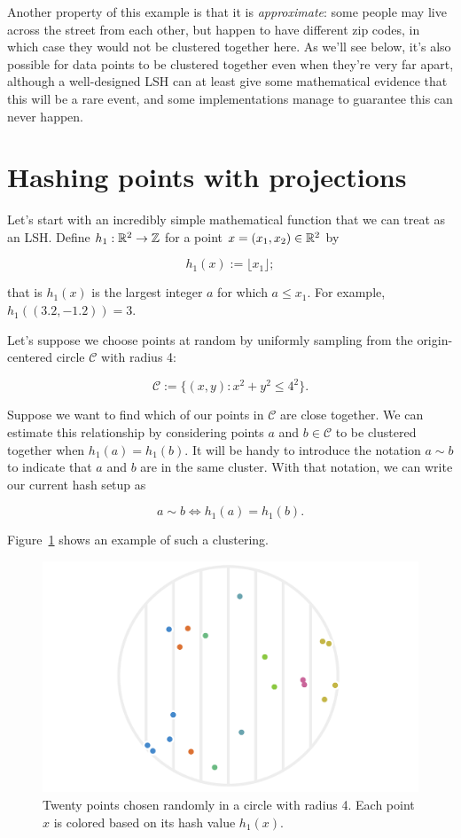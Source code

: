 \documentclass[20pt,]{extarticle}
\begin{document}
Another property of this example is that it is \emph{approximate}: some
people may live across the street from each other, but happen to have
different zip codes, in which case they would not be clustered together
here. As we'll see below, it's also possible for data points to be
clustered together even when they're very far apart, although a
well-designed LSH can at least give some mathematical evidence that this
will be a rare event, and some implementations manage to guarantee this
can never happen.

\section{Hashing points with
projections}\label{hashing-points-with-projections}

Let's start with an incredibly simple mathematical function that we can
treat as an LSH. Define \(h_1:\mathbb{R}^2 \to \mathbb{Z}\) for a point
\(x=(x_1, x_2)\in\mathbb{R}^2\) by

\[ h_1(x) := \lfloor x_1 \rfloor; \]

that is \(h_1(x)\) is the largest integer \(a\) for which \(a\le x_1.\)
For example, \(h_1((3.2, -1.2)) = 3.\)

Let's suppose we choose points at random by uniformly sampling from the
origin-centered circle \(\mathcal C\) with radius 4:

\[ \mathcal C := \{ (x, y) : x^2 + y^2 \le 4^2 \}. \]

Suppose we want to find which of our points in \(\mathcal C\) are close
together. We can estimate this relationship by considering points \(a\)
and \(b \in \mathcal C\) to be clustered together when
\(h_1(a) = h_1(b).\) It will be handy to introduce the notation
\(a \sim b\) to indicate that \(a\) and \(b\) are in the same cluster.
With that notation, we can write our current hash setup as

\[ a \sim b \iff h_1(a) = h_1(b). \]

Figure~\ref{fig:fig1} shows an example of such a clustering.

\begin{figure}
\centering
\includegraphics{images/lsh_image1_v2.png}
\caption{Twenty points chosen randomly in a circle with radius 4. Each
point \(x\) is colored based on its hash value
\(h_1(x).\)}\label{fig:fig1}
\end{figure}
\end{document}
